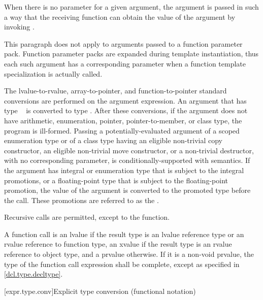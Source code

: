 \pnum
{}%
When there is no parameter for a given argument, the argument is passed
in such a way that the receiving function can obtain the value of the
argument by invoking .
\begin{note}
This paragraph does not apply to arguments passed to a function parameter pack.
Function parameter packs are expanded during template instantiation,
thus each such argument has a corresponding parameter when a function template
specialization is actually called.
\end{note}
The
lvalue-to-rvalue, array-to-pointer,
and function-to-pointer standard conversions are
performed on the argument expression.
An argument that has type \cv{}~ is converted
to type .
After these conversions, if the
argument does not have arithmetic, enumeration, pointer, pointer-to-member,
or class type, the program is ill-formed.
Passing a potentially-evaluated argument
of a scoped enumeration type or
of a class type having
an eligible non-trivial copy constructor,
an eligible non-trivial move constructor, or
a non-trivial destructor,
with no corresponding parameter, is conditionally-supported with
 semantics. If the argument has
integral or enumeration type that is subject to the integral
promotions, or a floating-point type that is subject to the
floating-point promotion, the value of the argument is converted to the
promoted type before the call. These promotions are referred to as
the .

\pnum
{}%
Recursive calls are permitted, except to the 
function.

\pnum
A function call is an lvalue
if the result type is an lvalue reference type or an rvalue reference to function type,
an xvalue if the result type is an rvalue reference to object type, and a prvalue
otherwise.
If it is a non-void prvalue,
the type of the function call expression shall be complete,
except as specified in \ref{dcl.type.decltype}.

[expr.type.conv]{Explicit type conversion (functional notation)}


